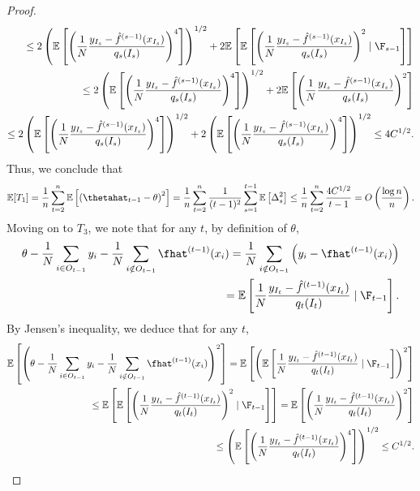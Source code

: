 \documentclass[11pt]{article}
\begin{document}
\begin{proof}
\begin{align*}
        \leq 2\left(\mathbb{E}\left[ \left( \frac{1}{N}\frac{y_{I_s} - \hat{f}^{(s-1)}(x_{I_s})}{q_s(I_s)} \right)^4 \right]\right)^{1/2} + 2\mathbb{E}\left[ \mathbb{E}\left[ \left( \frac{1}{N}\frac{y_{I_s} - \hat{f}^{(s-1)}(x_{I_s})}{q_s(I_s)} \right)^2 \mid \F_{s-1} \right] \right]\\
        \leq 2\left(\mathbb{E}\left[ \left( \frac{1}{N}\frac{y_{I_s} - \hat{f}^{(s-1)}(x_{I_s})}{q_s(I_s)} \right)^4 \right]\right)^{1/2} + 2\mathbb{E}\left[ \left( \frac{1}{N}\frac{y_{I_s} - \hat{f}^{(s-1)}(x_{I_s})}{q_s(I_s)} \right)^2 \right]\\
        \leq 2\left(\mathbb{E}\left[ \left( \frac{1}{N}\frac{y_{I_s} - \hat{f}^{(s-1)}(x_{I_s})}{q_s(I_s)} \right)^4 \right]\right)^{1/2} + 2\left(\mathbb{E}\left[ \left( \frac{1}{N}\frac{y_{I_s} - \hat{f}^{(s-1)}(x_{I_s})}{q_s(I_s)} \right)^4 \right] \right)^{1/2} \leq 4C^{1/2}.
    \end{align*}
    Thus, we conclude that
    \begin{align*}
        \mathbb{E}[T_1] = \frac{1}{n}\sum_{t=2}^n \mathbb{E}\left[ \left( \thetahat_{t-1} - \theta \right)^2 \right] = \frac{1}{n}\sum_{t=2}^n \frac{1}{(t-1)^2} \sum_{s=1}^{t-1} \mathbb{E}\left[ \Delta_s^2 \right] \leq \frac{1}{n}\sum_{t=2}^n \frac{4C^{1/2}}{t-1} = O\left( \frac{\log n}{n} \right).
    \end{align*}
    Moving on to $T_3$, we note that for any $t$, by definition of $\theta$,
    \begin{align*}
        \theta - \frac{1}{N} \sum_{i \in O_{t-1}} y_i - \frac{1}{N} \sum_{i \notin O_{t-1}} \fhat^{(t-1)}(x_i) = \frac{1}{N} \sum_{i \notin O_{t-1}} \left( y_i - \fhat^{(t-1)}(x_i) \right)\\ = \mathbb{E}\left[ \frac{1}{N}\frac{y_{I_t} - \hat{f}^{(t-1)}(x_{I_t})}{q_t(I_t)} \mid \F_{t-1} \right].
    \end{align*}
    By Jensen's inequality, we deduce that for any $t$,
    \begin{align*}
        \mathbb{E}\left[ \left( \theta - \frac{1}{N} \sum_{i \in O_{t-1}} y_i - \frac{1}{N} \sum_{i \notin O_{t-1}} \fhat^{(t-1)}(x_i) \right)^2 \right] = \mathbb{E}\left[ \left( \mathbb{E}\left[ \frac{1}{N}\frac{y_{I_t} - \hat{f}^{(t-1)}(x_{I_t})}{q_t(I_t)} \mid \F_{t-1} \right] \right)^2 \right]\\
        \leq \mathbb{E}\left[ \mathbb{E}\left[ \left( \frac{1}{N}\frac{y_{I_t} - \hat{f}^{(t-1)}(x_{I_t})}{q_t(I_t)} \right)^2 \mid \F_{t-1} \right] \right] = \mathbb{E}\left[ \left( \frac{1}{N}\frac{y_{I_t} - \hat{f}^{(t-1)}(x_{I_t})}{q_t(I_t)} \right)^2 \right]\\ \leq \left( \mathbb{E}\left[ \left( \frac{1}{N}\frac{y_{I_t} - \hat{f}^{(t-1)}(x_{I_t})}{q_t(I_t)} \right)^4 \right] \right)^{1/2} \leq C^{1/2}.

\end{align*}
\end{proof}
\end{document}
